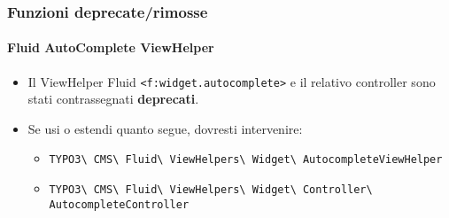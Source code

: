 \begin{frame}[fragile]
	\frametitle{Funzioni deprecate/rimosse}
	\framesubtitle{Fluid AutoComplete ViewHelper}

	\begin{itemize}
		\item Il ViewHelper Fluid \texttt{<f:widget.autocomplete>} e il relativo controller
               sono stati contrassegnati \textbf{deprecati}.
		\item Se usi o estendi quanto segue, dovresti intervenire:

			\begin{itemize}\smaller
				\item \texttt{TYPO3\textbackslash
					CMS\textbackslash
					Fluid\textbackslash
					ViewHelpers\textbackslash
					Widget\textbackslash
					AutocompleteViewHelper}
				\item \texttt{TYPO3\textbackslash
					CMS\textbackslash
					Fluid\textbackslash
					ViewHelpers\textbackslash
					Widget\textbackslash
					Controller\textbackslash
					AutocompleteController}
			\end{itemize}

	\end{itemize}

\end{frame}


